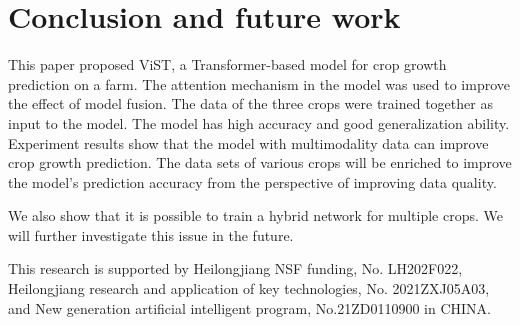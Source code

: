 \documentclass[acmsmall,manuscript, screen, review]{acmart}
\begin{document}
\section{Conclusion and future work}
This paper proposed ViST, a Transformer-based model for crop growth prediction on a farm. The attention mechanism in the model was used to improve the effect of model fusion. The data of the three crops were trained together as input to the model. The model has high accuracy and good generalization ability. Experiment results show that the model with multimodality data can improve crop growth prediction. The data sets of various crops will be enriched to improve the model's prediction accuracy from the perspective of improving data quality.

We also show that it is possible to train a hybrid network for multiple crops. We will further investigate this issue in the future.
\begin{acks}
  This research is supported by Heilongjiang NSF funding, No. LH202F022, Heilongjiang research and application of key technologies, No. 2021ZXJ05A03, and New generation artificial intelligent program, No.21ZD0110900 in CHINA.
\end{acks}





\appendix
\end{document}
